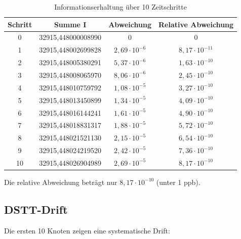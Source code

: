 \documentclass[12pt,a4paper]{article}
\begin{document}
\begin{table}[H]
\centering
\begin{tabular}{c|c|c|c}
Schritt & Summe I & Abweichung & Relative Abweichung \\
\hline
0 & 32915,448000008990 & 0 & 0 \\
1 & 32915,448002699828 & $2,69\cdot 10^{-6}$ & $8,17\cdot 10^{-11}$ \\
2 & 32915,448005380291 & $5,37\cdot 10^{-6}$ & $1,63\cdot 10^{-10}$ \\
3 & 32915,448008065970 & $8,06\cdot 10^{-6}$ & $2,45\cdot 10^{-10}$ \\
4 & 32915,448010759792 & $1,08\cdot 10^{-5}$ & $3,27\cdot 10^{-10}$ \\
5 & 32915,448013450899 & $1,34\cdot 10^{-5}$ & $4,09\cdot 10^{-10}$ \\
6 & 32915,448016144241 & $1,61\cdot 10^{-5}$ & $4,90\cdot 10^{-10}$ \\
7 & 32915,448018831317 & $1,88\cdot 10^{-5}$ & $5,72\cdot 10^{-10}$ \\
8 & 32915,448021521130 & $2,15\cdot 10^{-5}$ & $6,54\cdot 10^{-10}$ \\
9 & 32915,448024219520 & $2,42\cdot 10^{-5}$ & $7,36\cdot 10^{-10}$ \\
10 & 32915,448026904989 & $2,69\cdot 10^{-5}$ & $8,17\cdot 10^{-10}$ \\
\end{tabular}
\caption{Informationserhaltung über 10 Zeitschritte}
\label{tab:conservation}
\end{table}

Die relative Abweichung beträgt nur $8,17 \cdot 10^{-10}$ (unter 1 ppb).

\subsection{DSTT-Drift}

Die ersten 10 Knoten zeigen eine systematische Drift:
\end{document}
